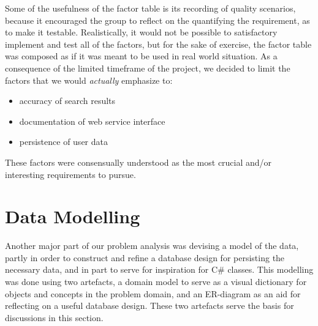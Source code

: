 Some of the usefulness of the factor table is its recording of quality scenarios, because it encouraged the group to reflect on the quantifying the requirement, as to make it testable. Realistically, it would not be possible to satisfactory implement and test all of the factors, but for the sake of exercise, the factor table was composed as if it was meant to be used in  real world situation. As a consequence of the limited timeframe of the project, we decided to limit the factors that we would \textit{actually} emphasize to:
\begin{itemize}
\item accuracy of search results
\item documentation of web service interface
\item persistence of user data
\end{itemize}

These factors were consensually understood as the most crucial and/or interesting requirements to pursue.

\section{Data Modelling}
Another major part of our problem analysis was devising a model of the data, partly in order to construct and refine a database design for persisting the necessary data, and in part to serve for inspiration for C\# classes.
This modelling was done using two artefacts, a domain model to serve as a visual dictionary for objects and concepts in the problem domain, and an ER-diagram as an aid for reflecting on a useful database design. These two artefacts serve the basis for discussions in this section.
